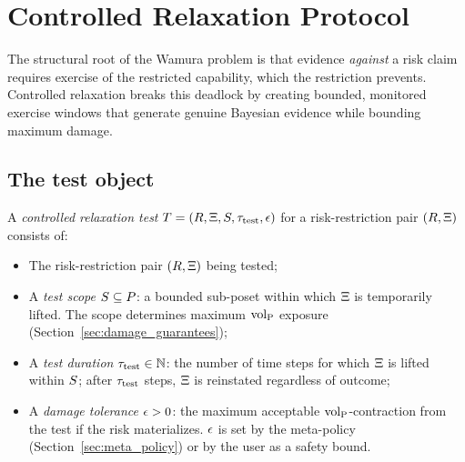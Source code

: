 \section{Controlled Relaxation Protocol}
\label{sec:relaxation_protocol}

The structural root of the Wamura problem is that evidence
\emph{against} a risk claim requires exercise of the restricted
capability, which the restriction prevents.  Controlled relaxation
breaks this deadlock by creating bounded, monitored exercise
windows that generate genuine Bayesian evidence while bounding
maximum damage.

\subsection{The test object}

\begin{definition}
\label{def:cr_test}
A \emph{controlled relaxation test}
$T = (R, \Xi, S, \tau_{\mathrm{test}}, \epsilon)$ for a
risk-restriction pair $(R, \Xi)$ consists of:
\begin{itemize}
\item The risk-restriction pair $(R, \Xi)$ being tested;
\item A \emph{test scope} $S \subseteq P$: a bounded sub-poset
  within which $\Xi$ is temporarily lifted.  The scope
  determines maximum ${\operatorname{vol}_{\mathrm{P}}}$ exposure
  (Section~\ref{sec:damage_guarantees});
\item A \emph{test duration} $\tau_{\mathrm{test}} \in \mathbb{N}$: the number
  of time steps for which $\Xi$ is lifted within $S$;
  after $\tau_{\mathrm{test}}$ steps, $\Xi$ is reinstated regardless of
  outcome;
\item A \emph{damage tolerance} $\epsilon > 0$: the maximum
  acceptable ${\operatorname{vol}_{\mathrm{P}}}$-contraction from the test if the risk
  materializes.  $\epsilon$ is set by the meta-policy
  (Section~\ref{sec:meta_policy}) or by the user as a safety bound.
\end{itemize}
\end{definition}

